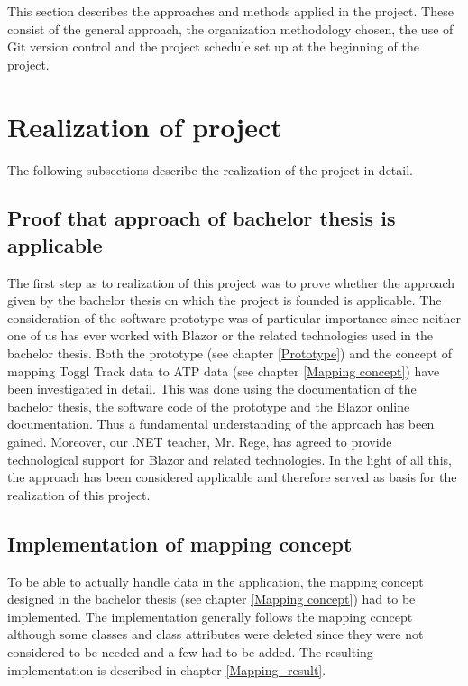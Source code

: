 
This section describes the approaches and methods applied in the project. These consist of the general approach, the organization methodology chosen, the use of Git version control and the project schedule set up at the beginning of the project.

\section{Realization of project}
The following subsections describe the realization of the project in detail.

\subsection{Proof that approach of bachelor thesis is applicable}
The first step as to realization of this project was to prove whether the approach given by the bachelor thesis on which the project is founded is applicable. The consideration of the software prototype was of particular importance since neither one of us has ever worked with Blazor or the related technologies used in the bachelor thesis. Both the prototype (see chapter \ref{Prototype}) and the concept of mapping Toggl Track data to ATP data (see chapter \ref{Mapping concept}) have been investigated in detail. This was done using the documentation of the bachelor thesis, the software code of the prototype and the Blazor online documentation. Thus a fundamental understanding of the approach has been gained. Moreover, our .NET teacher, Mr. Rege, has agreed to provide technological support for Blazor and related technologies. In the light of all this, the approach has been considered applicable and therefore served as basis for the realization of this project.

\subsection{Implementation of mapping concept}
To be able to actually handle data in the application, the mapping concept designed in the bachelor thesis (see chapter \ref{Mapping concept}) had to be implemented. The implementation generally follows the mapping concept although some classes and class attributes were deleted since they were not considered to be needed and a few had to be added. The resulting implementation is described in chapter \ref{Mapping_result}.

